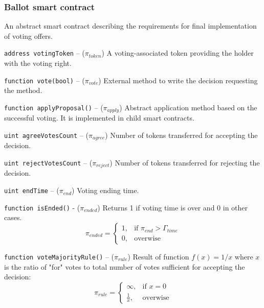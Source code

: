 \documentclass[12pt]{report}
\newcommand{\hlc}[1]{\colorbox{white!25}{#1}}
\def\code#1{\colorbox{light-gray}{\texttt{#1}}}
\begin{document}
\subsubsection{Ballot smart contract}
\label{tech-apps-voting-ballot}
An abstract smart contract describing the requirements for final implementation of voting offers.

\code{address votingToken} – ($\pi_{token}$)\hfill\null\linebreak
A voting-associated token providing the holder with the voting right.

\code{function vote(bool)} – ($\pi_{vote}$)\hfill\null\linebreak
External method to write the decision requesting the method.

\code{function applyProposal()} – ($\pi_{apply}$)\hfill\null\linebreak
Abstract application method based on the successful voting. It is implemented in child smart contracts.

\code{uint agreeVotesCount} – ($\pi_{agree}$)\hfill\null\linebreak
Number of tokens transferred for accepting the decision.

\code{uint rejectVotesCount} – ($\pi_{reject}$)\hfill\null\linebreak
Number of tokens transferred for rejecting the decision.

\code{uint endTime} – ($\pi_{end}$)\hfill\null\linebreak
Voting ending time.

\code{function isEnded()}  - ($\pi_{ended}$)\hfill\null\linebreak
Returns 1 if voting time is over and 0 in other cases.
\begin{equation}
\pi_{ended} = \begin{cases}
	1, & \text{if } \pi_{end} > \Gamma_{time} \\
	0, & \text{overwise}
\end{cases}
\end{equation}

\code{function voteMajorityRule()} – ($\pi_{rule}$)\hfill\null\linebreak 
\hlc{Result of function} $f(x) = 1/x$ where $x$ is the ratio of "for" votes to total number of votes sufficient for accepting the decision:
\begin{equation}
\pi_{rule} = \begin{cases}
	\infty, & \text{if } x = 0 \\
	\frac{1}{x}, & \text{overwise}
\end{cases}
\end{equation}
\end{document}
